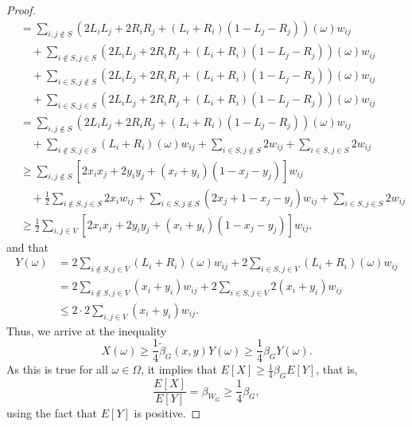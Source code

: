 \documentclass[12pt,a4paper,bold]{thesis}
\theoremstyle{definition}
\begin{document}
\begin{proof}
\begin{align*}
        & = 
        \sum_{i,j \notin S} 
        (2 L_i L_j + 2 R_i R_j + (L_i + R_i)(1 - L_j - R_j))(\omega) w_{ij}
        \\
        & \quad +
        \sum_{i \notin S, j \in S} 
        (2 L_i L_j + 2 R_i R_j + (L_i + R_i)(1 - L_j - R_j))(\omega) w_{ij}
        \\
        & \quad +
        \sum_{i \in S, j \notin S} 
        (2 L_i L_j + 2 R_i R_j + (L_i + R_i)(1 - L_j - R_j))(\omega) w_{ij}
        \\
        & \quad +
        \sum_{i \in S, j \in S} 
        (2 L_i L_j + 2 R_i R_j + (L_i + R_i)(1 - L_j - R_j))(\omega) w_{ij}
        \\
        & =
        \sum_{i,j \notin S} 
        (2 L_i L_j + 2 R_i R_j + (L_i + R_i)(1 - L_j - R_j))(\omega) w_{ij}
        \\
        & \quad +
        \sum_{i \notin S, j \in S} (L_i + R_i)(\omega) w_{ij}
        + \sum_{i \in S, j \notin S} 2 w_{ij} + \sum_{i \in S, j \in S} 2 w_{ij}
        \\
        & \geq
        \sum_{i,j \notin S} [2 x_i x_j + 2 y_i y_j + (x_i + y_i)(1 - x_j - y_j)] w_{ij}
        \\
        & \quad +
        \frac{1}{2} \sum_{i \notin S, j \in S} 2x_i w_{ij} 
        + \sum_{i \in S, j \notin S} (2x_j + 1 - x_j - y_j) w_{ij}
        + \sum_{i \in S, j \in S} 2 w_{ij}
        \\
        & \geq
        \frac{1}{2} \sum_{i,j \in V} 
        [2 x_i x_j + 2 y_i y_j + (x_i + y_i)(1 - x_j - y_j)] w_{ij},
    \end{align*}
    and that
    \begin{align*}
        Y(\omega) 
        & = 
        2 \sum_{i \notin S, j \in V} (L_i + R_i)(\omega) w_{ij}
        + 2 \sum_{i \in S, j \in V} (L_i + R_i)(\omega) w_{ij}
        \\
        & =
        2 \sum_{i \notin S, j \in V} (x_i + y_i) w_{ij} 
        + 2 \sum_{i \in S, j \in V} 2 (x_i + y_i) w_{ij}
        \\
        & \leq 
        2 \cdot 2 \sum_{i,j \in V} (x_i + y_i) w_{ij}.
    \end{align*}
    Thus, we arrive at the inequality 
    \begin{equation*}
        X(\omega) \geq \frac{1}{4} \tilde \beta_G(x,y) Y(\omega) 
        \geq \frac{1}{4} \beta_G Y(\omega). 
    \end{equation*}
    As this is true for all $\omega \in \Omega$, it implies that 
    $E[X] \geq \frac{1}{4} \beta_G E[Y]$, that is, 
    \begin{equation*}
        \frac{E[X]}{E[Y]} = \beta_{W_G} \geq \frac{1}{4} \beta_G,
    \end{equation*}
    using the fact that $E[Y]$ is positive.
\end{proof}
\end{document}
